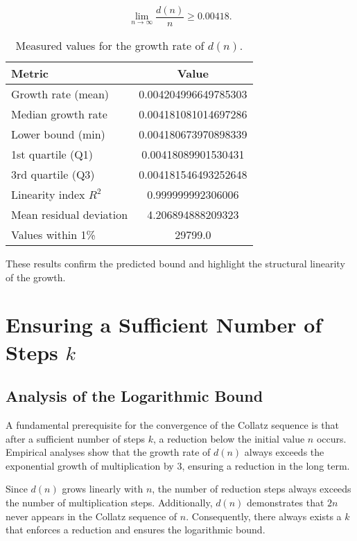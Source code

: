 \documentclass[a4paper,12pt]{article}
\begin{document}
\begin{equation}
    \lim_{n \to \infty} \frac{d(n)}{n} \geq 0.00418.
\end{equation}

\begin{table}[h]
    \centering
    \begin{tabular}{|l|c|}
        \hline
        \textbf{Metric} & \textbf{Value} \\
        \hline
        Growth rate (mean) & 0.004204996649785303 \\
        Median growth rate & 0.004181081014697286 \\
        Lower bound (min) & 0.004180673970898339 \\
        1st quartile (Q1) & 0.00418089901530431 \\
        3rd quartile (Q3) & 0.004181546493252648 \\
        Linearity index \( R^2 \) & 0.999999992306006 \\
        Mean residual deviation & 4.206894888209323 \\
        Values within 1\% & 29799.0 \\
        \hline
    \end{tabular}
    \caption{Measured values for the growth rate of \( d(n) \).}
\end{table}

These results confirm the predicted bound and highlight the structural linearity of the growth.



\section{Ensuring a Sufficient Number of Steps \( k \)}

\subsection{Analysis of the Logarithmic Bound}

A fundamental prerequisite for the convergence of the Collatz sequence is that after a sufficient number of steps \( k \), a reduction below the initial value \( n \) occurs. Empirical analyses show that the growth rate of \( d(n) \) always exceeds the exponential growth of multiplication by 3, ensuring a reduction in the long term.

Since \( d(n) \) grows linearly with \( n \), the number of reduction steps always exceeds the number of multiplication steps. Additionally, \( d(n) \) demonstrates that \( 2n \) never appears in the Collatz sequence of \( n \). Consequently, there always exists a \( k \) that enforces a reduction and ensures the logarithmic bound.
\end{document}
